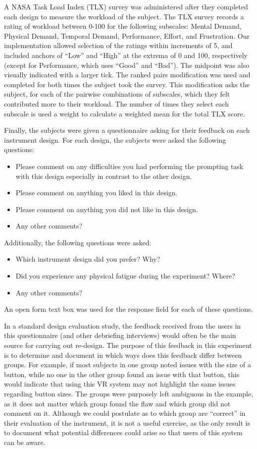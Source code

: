 A NASA Task Load Index (TLX) survey \citep{hart_development_1988} was administered after they completed each design to measure the workload of the subject.
The TLX survey records a rating of workload between 0-100 for the following subscales: Mental Demand, Physical Demand, Temporal Demand, Performance, Effort, and Frustration.
Our implementation allowed selection of the ratings within increments of 5, and included anchors of ``Low'' and ``High'' at the extrema of 0 and 100, respectively (except for Performance, which uses ``Good'' and ``Bad'').
The midpoint was also visually indicated with a larger tick.
The ranked pairs modification was used and completed for both times the subject took the survey.
This modification asks the subject, for each of the pairwise combinations of subscales, which they felt contributed more to their workload.
The number of times they select each subscale is used a weight to calculate a weighted mean for the total TLX score.

Finally, the subjects were given a questionnaire asking for their feedback on each instrument design.
For each design, the subjects were asked the following questions:
\begin{itemize}
    \item Please comment on any difficulties you had performing the prompting task with this design especially in contrast to the other design.
    \item Please comment on anything you liked in this design.
    \item Please comment on anything you did not like in this design.
    \item Any other comments?
\end{itemize}
Additionally, the following questions were asked:
\begin{itemize}
    \item Which instrument design did you prefer? Why?
    \item Did you experience any physical fatigue during the experiment? Where?
    \item Any other comments?
\end{itemize}
An open form text box was used for the response field for each of these questions.

In a standard design evaluation study, the feedback received from the users in this questionnaire (and other debriefing interviews) would often be the main source for carrying out re-design.
The purpose of this feedback in this experiment is to determine and document in which ways does this feedback differ between groups.
For example, if most subjects in one group noted issues with the size of a button, while no one in the other group found an issue with that button, this would indicate that using this VR system may not highlight the same issues regarding button sizes.
The groups were purposely left ambiguous in the example, as it does not matter which group found the flaw and which group did not comment on it.
Although we could postulate as to which group are ``correct'' in their evaluation of the instrument, it is not a useful exercise, as the only result is to document what potential differences could arise so that users of this system can be aware.

